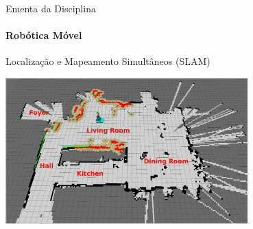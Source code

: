 \documentclass[aspectratio=169]{beamer}
\begin{document}
\begin{frame}[c]{Ementa da Disciplina}
	\framesubtitle{Robótica Móvel}
	\begin{block}{Localização e Mapeamento Simultâneos (SLAM)}
	\end{block}
	\begin{center}
		\includegraphics[width=0.7\textwidth]{./images/slam-example.png}
	\end{center}
\end{frame}
\end{document}
